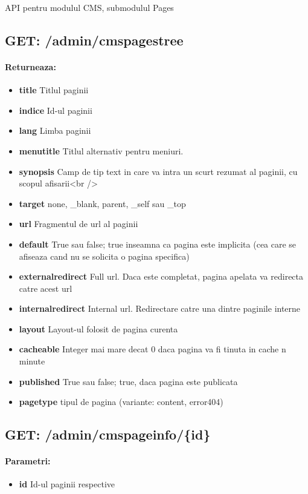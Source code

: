 API pentru modulul CMS, submodulul Pages \subsection*{GET: /admin/cmspagestree}

\paragraph{Returneaza:}
\begin{itemize}
\item \textbf{title}
 Titlul paginii
\item \textbf{indice}
 Id-ul paginii
\item \textbf{lang}
 Limba paginii
\item \textbf{menutitle}
 Titlul alternativ pentru meniuri. 
\item \textbf{synopsis}
 Camp de tip text in care va intra un scurt rezumat al paginii, cu scopul afisarii<br />
\item \textbf{target}
 none, \_blank, parent, \_self sau \_top
\item \textbf{url}
 Fragmentul de url al paginii
\item \textbf{default}
 True sau false; true inseamna ca pagina este implicita (cea care se afiseaza cand nu se solicita o pagina specifica)
\item \textbf{externalredirect}
 Full url. Daca este completat, pagina apelata va redirecta catre acest url 
\item \textbf{internalredirect}
 Internal url. Redirectare catre una dintre paginile interne
\item \textbf{layout}
 Layout-ul folosit de pagina curenta
\item \textbf{cacheable}
 Integer mai mare decat 0 daca pagina va fi tinuta in cache n minute
\item \textbf{published}
 True sau false; true, daca pagina este publicata
\item \textbf{pagetype}
 tipul de pagina (variante: content, error404)
 \end{itemize}
 \subsection*{GET: /admin/cmspageinfo/\{id\}}

\paragraph{Parametri:}
\begin{itemize}
\item \textbf{id}
 Id-ul paginii respective
 \end{itemize}
